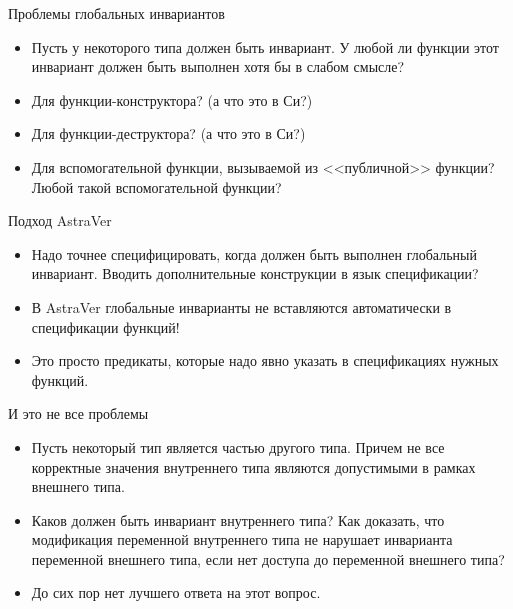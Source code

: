 \documentclass[hyperref={unicode=true}]{beamer}
\begin{document}
    \begin{frame}{Проблемы глобальных инвариантов}
    \begin{itemize}
    \item
    Пусть у некоторого типа должен быть инвариант.
    У любой ли функции этот инвариант должен быть
    выполнен хотя бы в слабом смысле?
    \item
    Для функции-конструктора? (а что это в Си?)
    \item
    Для функции-деструктора? (а что это в Си?)
    \item
    Для вспомогательной функции, вызываемой из
    <<публичной>> функции? Любой такой вспомогательной
    функции?
    \end{itemize}
    \end{frame}

    \begin{frame}{Подход AstraVer}
    \begin{itemize}
    \item
    Надо точнее специфицировать, когда должен быть
    выполнен глобальный инвариант. Вводить дополнительные
    конструкции в язык спецификации?
    \item
    В AstraVer глобальные инварианты не
    вставляются автоматически в спецификации функций!
    \item
    Это просто предикаты, которые надо явно
    указать в спецификациях нужных функций.
    \end{itemize}
    \end{frame}

    \begin{frame}{И это не все проблемы}
    \begin{itemize}
    \item
    Пусть некоторый тип является частью другого типа.
    Причем не все корректные значения внутреннего
    типа являются допустимыми в рамках внешнего типа.
    \item
    Каков должен быть инвариант внутреннего типа?
    Как доказать, что модификация переменной
    внутреннего типа не нарушает инварианта
    переменной внешнего типа, если нет доступа
    до переменной внешнего типа?
    \item
    До сих пор нет лучшего ответа на этот вопрос.
    \end{itemize}
    \end{frame}
\end{document}
